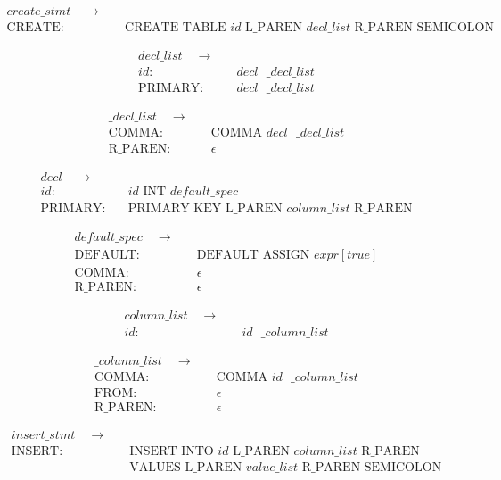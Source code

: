 \documentclass{article}
\begin{document}
\begin{align*}
create\_stmt \quad  \to & \quad\\
\text{CREATE:} & \quad \text{CREATE TABLE } id \text{ L\_PAREN } decl\_list \text{ R\_PAREN SEMICOLON}
\end{align*}

\begin{align*}
decl\_list \quad  \to & \quad\\
id: & \quad decl\text{ }\_decl\_list \\
\text{PRIMARY}: & \quad decl\text{ }\_decl\_list
\end{align*}

\begin{align*}
\_decl\_list \quad  \to & \quad\\
\text{COMMA}: & \quad \text{COMMA } decl\text{ }\_decl\_list \\
\text{R\_PAREN}: & \quad \epsilon
\end{align*}

\begin{align*}
decl \quad  \to & \quad\\
id: & \quad id \text{ INT } default\_spec \\
\text{PRIMARY}: & \quad \text{PRIMARY KEY L\_PAREN }column\_list \text{ R\_PAREN}
\end{align*}

\begin{align*}
default\_spec \quad  \to & \quad\\
\text{DEFAULT}: & \quad \text{DEFAULT ASSIGN } expr[true] \\
\text{COMMA}: & \quad \epsilon \\
\text{R\_PAREN}: & \quad \epsilon
\end{align*}

\begin{align*}
column\_list \quad  \to & \quad\\
id: & \quad id \text{ } \_column\_list
\end{align*}


\begin{align*}
\_column\_list \quad  \to & \quad\\
\text{COMMA}: & \quad \text{COMMA } id \text{ } \_column\_list \\
\text{FROM}: & \quad \epsilon \\
\text{R\_PAREN}: & \quad \epsilon
\end{align*}

\begin{align*}
insert\_stmt \quad  \to & \quad\\
\text{INSERT}: & \quad \text{INSERT INTO } id \text{ L\_PAREN } column\_list \text{ R\_PAREN} \\
& \quad \text{VALUES L\_PAREN } value\_list \text{ R\_PAREN SEMICOLON}
\end{align*}
\end{document}
